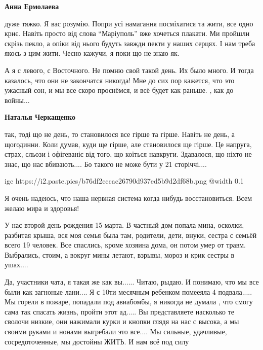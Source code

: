 \begin{itemize} %
\textbf{Анна Ермолаева} 

дуже тяжко. Я вас розумію. Попри усі намагання посміхатися та жити, все одно
криє. Навіть просто від слова \enquote{Маріуполь} вже хочеться плакати. Ми пройшли
скрізь пекло, а опіки від нього будуть завжди пекти у наших серцях. І нам треба
якось з цим жити. Чесно кажучи, я поки що не знаю як.

\end{itemize} %


А я с левого, с Восточного. Не помню свой такой день. Их было много. И тогда
казалось, что они не закончатся никогда! Мне до сих пор кажется, что это
ужасный сон, и мы все скоро проснёмся, и всё будет как раньше. , как до войны...

\begin{itemize} %
\textbf{Наталья Черкащенко} 

так, тоді що не день, то становилося все гірше та гірше. Навіть не день, а
щогодинни. Коли думав, куди ще гірше, але становилося ще гірше. Це напруга,
страх, сльози і офігеваніє від того, що коїться навкруги. Здавалося, що ніхто
не знає, що нас вбивають.... Бо такого не може бути у 21 сторіччі....

\end{itemize} %


\ifcmt
  igc https://i2.paste.pics/b76df2cccac26790d937ed5b9d2df68b.png
	@width 0.1
\fi


Я очень надеюсь, что наша нервная система когда нибудь восстановиться. Всем
желаю мира и здоровья!


У нас второй день рождения 15 марта. В частный дом попала мина, осколки,
разбитая крыша, вся моя семья была там, родители, дети, внуки, сестра с семьёй
всего 19 человек. Все спаслись, кроме хозяина дома, он потом умер от травм.
Выбрались, стоим, а вокруг мины летают, взрывы, мороз и крик сестры в ушах....


Да, участники чата, я такая же как вы...... Читаю, рыдаю. И понимаю, что мы все
были как загноные лани.... Я с 10ти месячным ребенком помееяла 4 подвала.....
Мы горели в пожаре, попадали под авиабомбы, я никогда не думала , что смогу
сама так спасать жизнь, пройти этот ад..... Вы представляете насколько те
сволочи низкие, они нажимали курки и кнопки глядя на нас с высока, а мы своими
руками и нонами выгребали это все.... Мы сильные, удачливые, сосредоточенные,
мы достойны ЖИТЬ. И нам всё под силу

